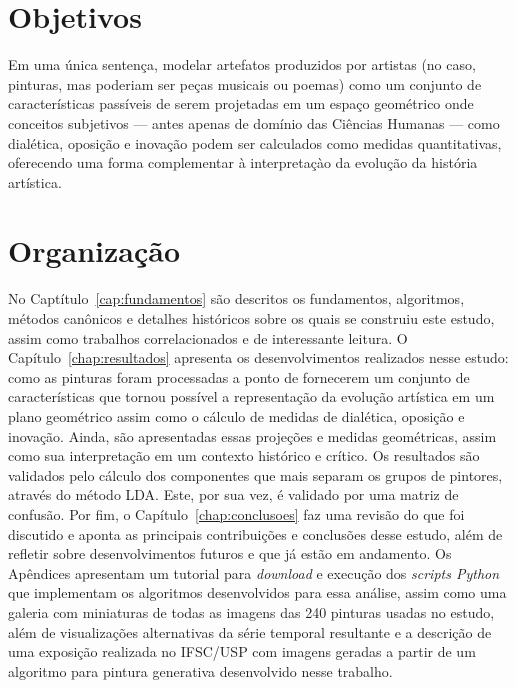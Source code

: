 \section{Objetivos}

Em uma única sentença, modelar artefatos produzidos por artistas (no
caso, pinturas, mas poderiam ser peças musicais ou poemas) como um
conjunto de características passíveis de serem projetadas em um espaço
geométrico onde conceitos subjetivos --- antes apenas de domínio das
Ciências Humanas --- como dialética, oposição e inovação podem ser
calculados como medidas quantitativas, oferecendo uma forma
complementar à interpretaçào da evolução da história artística.

\section{Organização}

No Captítulo~\ref{cap:fundamentos} são descritos os fundamentos,
algoritmos, métodos canônicos e detalhes históricos sobre os quais se
construiu este estudo, assim como trabalhos correlacionados e de
interessante leitura. O Capítulo~\ref{chap:resultados} apresenta os
desenvolvimentos realizados nesse estudo: como as pinturas foram
processadas a ponto de fornecerem um conjunto de características que
tornou possível a representação da evolução artística em um plano
geométrico assim como o cálculo de medidas de dialética, oposição e
inovação. Ainda, são apresentadas essas projeções e medidas
geométricas, assim como sua interpretação em um contexto histórico e
crítico. Os resultados são validados pelo cálculo dos componentes que
mais separam os grupos de pintores, através do método LDA. Este, por
sua vez, é validado por uma matriz de confusão. Por fim, o
Capítulo~\ref{chap:conclusoes} faz uma revisão do que foi discutido e
aponta as principais contribuições e conclusões desse estudo, além de
refletir sobre desenvolvimentos futuros e que já estão em
andamento. Os Apêndices apresentam um tutorial para \textit{download}
e execução dos \textit{scripts Python} que implementam os algoritmos
desenvolvidos para essa análise, assim como uma galeria com miniaturas
de todas as imagens das 240 pinturas usadas no estudo, além de
visualizações alternativas da série temporal resultante e a descrição
de uma exposição realizada no IFSC/USP com imagens geradas a partir de
um algoritmo para pintura generativa desenvolvido nesse trabalho.


